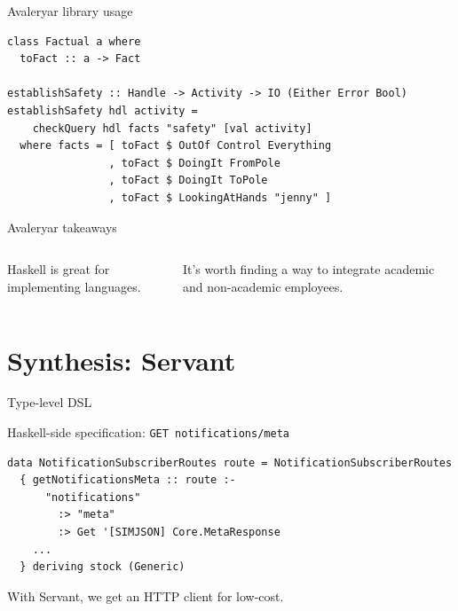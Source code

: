 \documentclass[aspectratio=169,ignorenonframetext]{beamer}
\begin{document}
\begin{frame}[fragile]{Avaleryar library usage}
	\begin{block}{}
		\begin{verbatim}
class Factual a where
  toFact :: a -> Fact

establishSafety :: Handle -> Activity -> IO (Either Error Bool)
establishSafety hdl activity =
    checkQuery hdl facts "safety" [val activity]
  where facts = [ toFact $ OutOf Control Everything
                , toFact $ DoingIt FromPole
                , toFact $ DoingIt ToPole
                , toFact $ LookingAtHands "jenny" ]
        \end{verbatim}
	\end{block}
\end{frame}

\begin{frame}{Avaleryar takeaways}
	\begin{columns}
		\begin{exampleblock}{}
			Haskell is great for implementing languages.
		\end{exampleblock}
		\begin{exampleblock}{}
			It's worth finding a way to integrate academic and non-academic
			employees.
		\end{exampleblock}
	\end{columns}
\end{frame}

\section{Synthesis: Servant}

\begin{frame}[fragile]{Type-level DSL}
	\begin{block}{Haskell-side specification: \tt{GET notifications/meta}}
		\begin{verbatim}
data NotificationSubscriberRoutes route = NotificationSubscriberRoutes
  { getNotificationsMeta :: route :-
      "notifications"
        :> "meta"
        :> Get '[SIMJSON] Core.MetaResponse
    ...
  } deriving stock (Generic)
        \end{verbatim}
	\end{block}
	With Servant, we get an HTTP client for low-cost.
\end{frame}
\end{document}
